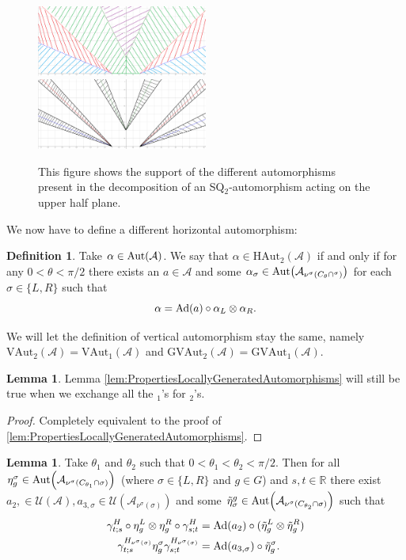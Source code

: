 \documentclass[12pt,a4paper,twoside]{article}
\let\originalleft\left
\let\originalright\right
\renewcommand{\left}{\mathopen{}\mathclose\bgroup\originalleft}
\renewcommand{\right}{\aftergroup\egroup\originalright}
\newcommand{\UU}{\mathcal U}
\renewcommand{\AA}{\mathcal A}
\newcommand{\RR}{\mathbb R}
\newcommand{\Ad}[1]{\textrm{Ad}\left(#1\right)}
\newcommand{\Aut}[1]{\textrm{Aut}\left(#1\right)}
\theoremstyle{definition}
\newtheorem{definition}[theorem]{Definition}
\newtheorem{lemma}[theorem]{Lemma}
\numberwithin{equation}{section}
\begin{document}
\begin{figure}
	\includegraphics[width=0.5\textwidth]{Figures/AlphaFirstDecomposition2.png}
	\includegraphics[width=0.5\textwidth]{Figures/AlphaSecondDecomposition2.png}
	\caption{This figure shows the support of the different automorphisms present in the decomposition of an SQ$_2$-automorphism acting on the upper half plane.}
	\label{fig:SetupSQAut2}
\end{figure}
We now have to define a different horizontal automorphism:
\begin{definition}
	Take $\alpha\in\Aut{\AA}$. We say that $\alpha\in\textrm{HAut}_2(\AA)$ if and only if for any $0<\theta<\pi/2$ there exists an $a\in\AA$ and some $\alpha_\sigma\in\Aut{\AA_{\nu^{\sigma}(C_\theta\cap^\sigma)}}$ for each $\sigma\in\{L,R\}$ such that
	\begin{equation}
		\alpha=\Ad{a}\circ\alpha_L\otimes\alpha_R.
	\end{equation}
\end{definition}
We will let the definition of vertical automorphism stay the same, namely $\textrm{VAut}_2(\AA)=\textrm{VAut}_1(\AA)$ and $\textrm{GVAut}_2(\AA)=\textrm{GVAut}_1(\AA)$.
\begin{lemma}\label{lem:PropertiesLocallyGeneratedAutomorphismsTwoTranslations}
	Lemma \ref{lem:PropertiesLocallyGeneratedAutomorphisms} will still be true when we exchange all the $_1$'s for $_2$'s.
\end{lemma}
\begin{proof}
	Completely equivalent to the proof of \ref{lem:PropertiesLocallyGeneratedAutomorphisms}.
\end{proof}
\begin{lemma}\label{lem:TwoAngleLemmaPart2ForTwoTranlations}
	Take $\theta_1$ and $\theta_2$ such that $0<\theta_1<\theta_2<\pi/2$. Then for all $\eta_{g}^{\sigma}\in\Aut{\AA_{\nu^{\sigma}(C_{\theta_1}\cap\sigma)}}$ (where $\sigma\in\{L,R\}$ and $g\in G$) and $s,t\in\RR$ there exist $a_{2},\in\UU(\AA),a_{3,\sigma}\in\UU(\AA_{\nu^{\sigma}(\sigma)})$ and some $\tilde{\eta}_{\sigma}^g\in \Aut{\AA_{\nu^\sigma(C_{\theta_2}\cap\sigma)}}$ such that
	\begin{align}
		\label{eq:TwoAngleLemmaPart2Equation1ForTwoTranlations}
		\gamma^{H}_{t;s}\circ\eta_{g}^L\otimes\eta_{g}^R\circ\gamma^{H}_{s;t}&=\Ad{a_2}\circ(\tilde\eta_{g}^L \otimes\tilde\eta_{g}^R)\\
		\label{eq:TwoAngleLemmaPart2Equation2ForTwoTranlations}
		\gamma^{H_{\nu^{\sigma}(\sigma)}}_{t;s}\eta_g^\sigma\gamma^{H_{\nu^\sigma(\sigma)}}_{s;t}&=\Ad{a_{3,\sigma}}\circ \tilde\eta_{g}^\sigma.
	\end{align}
\end{lemma}
\end{document}
